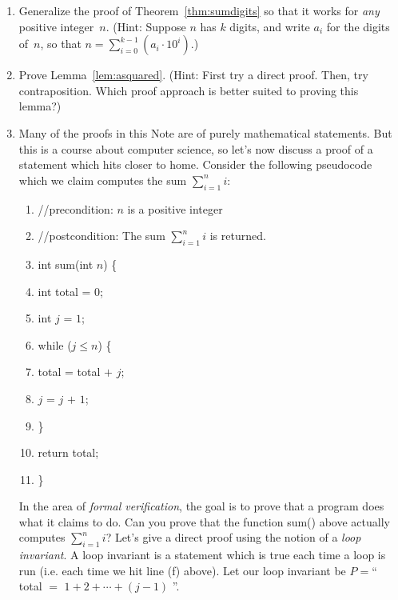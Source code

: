 \documentclass[11pt]{article}
\newcounter{thm}
\begin{document}
\begin{enumerate}
    \item Generalize the proof of Theorem~\ref{thm:sumdigits} so that it works for {\it any\/}
positive integer~$n$.  ({\sc Hint}: Suppose $n$ has $k$ digits, and
write $a_i$ for the digits of~$n$, so that $n=\sum_{i=0}^{k-1} (a_i\cdot10^i)$.)
    \item Prove Lemma~\ref{lem:asquared}. (Hint: First try a direct proof. Then, try contraposition. Which proof approach is better suited to proving this lemma?)
   
\iffalse
 \item Many of the proofs in this Note are of purely mathematical statements. But this is a course about computer science, so let's now discuss a proof of a statement which hits closer to home. Consider the following pseudocode which we claim computes the sum $\sum_{i=1}^ni$:
        \begin{enumerate}
            \item //precondition:  $n$ is a positive integer
            \item //postcondition: The sum $\sum_{i=1}^ni$ is returned.
            \item int sum(int $n$) \{
            \item \mbox{\hspace{5mm}} int total = $0$;
            \item \mbox{\hspace{5mm}} int $j$ = $1$;
            \item \mbox{\hspace{5mm}} while ($j\leq n$) \{
            \item \mbox{\hspace{10mm}}total = total $+$ $j$;
            \item \mbox{\hspace{10mm}}$j$ = $j$ $+$ $1$;
            \item \mbox{\hspace{5mm}}\}
            \item \mbox{\hspace{5mm}}return total;
            \item \}
        \end{enumerate}
        In the area of \emph{formal verification}, the goal is to {prove} that a program does what it claims to do. Can you prove that the function sum() above actually computes $\sum_{i=1}^ni$? Let's give a direct proof using the notion of a \emph{loop invariant}. A loop invariant is a statement which is true each time a loop is run (i.e. each time we hit line (f) above). Let our loop invariant be $P = $`` total $=$ $1+2+\cdots+(j-1)$ ''.


\end{enumerate}
\end{document}

